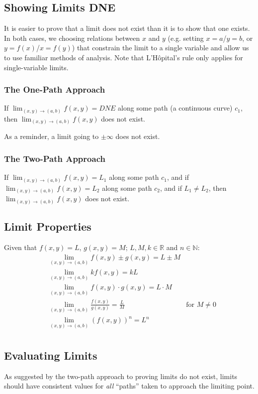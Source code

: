 \documentclass{article}
\begin{document}
\subsection{Showing Limits DNE}
It is easier to prove that a limit does not exist than it is to show that one exists. In both cases, we choosing relations between $x$ and $y$ (e.g. setting $x=a$/$y=b$, or $y=f(x)$/$x=f(y)$) that constrain the limit to a single variable and allow us to use familiar methods of analysis. Note that L'Hôpital's rule only applies for single-variable limits.

\subsubsection{The One-Path Approach}
If \(\lim_{(x,y)\to(a,b)}f(x,y) = DNE\) along some path (a continuous curve) $c_1$, then \(\lim_{(x,y)\to(a,b)}f(x,y)\) does not exist.

As a reminder, a limit going to $\pm\infty$ does not exist.

\subsubsection{The Two-Path Approach}
If \(\lim_{(x,y)\to(a,b)}f(x,y) = L_1\) along some path $c_1$, and if \(\lim_{(x,y)\to(a,b)}f(x,y) = L_2\) along some path $c_2$, and if $L_1\ne L_2$, then \(\lim_{(x,y)\to(a,b)}f(x,y)\) does not exist.

\subsection{Limit Properties}
Given that $f(x,y)=L$, $g(x,y)=M$; $L,M,k\in\mathbb{R}$ and $n\in\mathbb{N}$:
\begin{align*}
    &\lim_{(x,y)\to(a,b)}f(x,y)\pm g(x,y) = L \pm M \\
    &\lim_{(x,y)\to(a,b)}kf(x,y) = kL \\
    &\lim_{(x,y)\to(a,b)}f(x,y) \cdot g(x,y) = L \cdot M \\
    &\lim_{(x,y)\to(a,b)}\frac{f(x,y)}{g(x,y)} = \frac{L}{M} & \text{for } M\ne0 \\
    &\lim_{(x,y)\to(a,b)}(f(x,y))^n = L^n \\
\end{align*}

\subsection{Evaluating Limits}
As suggested by the two-path approach to proving limits do not exist, limits should have consistent values for \emph{all} ``paths'' taken to approach the limiting point.
\end{document}
